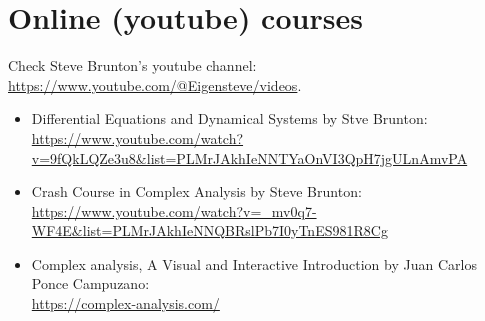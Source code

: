 \documentclass{article}
\begin{document}
\section*{Online (youtube) courses}
Check Steve Brunton's youtube channel: \url{https://www.youtube.com/@Eigensteve/videos}.
\begin{itemize}
\item Differential Equations and Dynamical Systems by Stve Brunton:\\
\url{https://www.youtube.com/watch?v=9fQkLQZe3u8&list=PLMrJAkhIeNNTYaOnVI3QpH7jgULnAmvPA}
\item Crash Course in Complex Analysis by Steve Brunton:\\
\url{https://www.youtube.com/watch?v=_mv0q7-WF4E&list=PLMrJAkhIeNNQBRslPb7I0yTnES981R8Cg}
\item Complex analysis, A Visual and Interactive Introduction
by Juan Carlos Ponce Campuzano:\\
\url{https://complex-analysis.com/}
\end{itemize}
\end{document}
